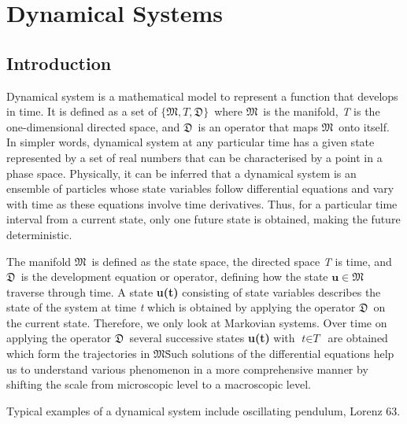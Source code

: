 \chapter{Dynamical Systems}

\section{Introduction}

Dynamical system is a mathematical model to represent a function that develops in time. It is defined as a set of $\lbrace\mathfrak{M},\textit{T},\mathfrak{D}\rbrace$\ where $\mathfrak{M}$\ is the manifold, \textit{T} is the one-dimensional directed space, and $\mathfrak{D}$\ is an operator that maps $\mathfrak{M}$\ onto itself. In simpler words, dynamical system at any particular time has a given state represented by a set of real numbers that can be characterised by a point in a phase space. Physically, it can be inferred that a dynamical system is an ensemble of particles whose state variables follow differential equations and vary with time as these equations involve time derivatives. Thus, for a particular time interval from a current state, only one future state is obtained, making the future deterministic. 

The manifold $\mathfrak{M}$\ is defined as the state space, the directed space \textit{T} is time, and $\mathfrak{D}$\ is the development equation or operator, defining how the state $\textbf{u}\in\mathfrak{M}$ traverse through time. A state \textbf{u(t)} consisting of state variables describes the state of the system at time \textit{t} which is obtained by applying the operator $\mathfrak{D}$\ on the current state. Therefore, we only look at Markovian systems. Over time on applying the operator $\mathfrak{D}$\, several successive states \textbf{u(t)} with $\textit{t}\in\textit{T}$\ are obtained which form the trajectories in $\mathfrak{M}$\. Such solutions of the differential equations help us to understand various phenomenon in a more comprehensive manner by shifting the scale from microscopic level to a macroscopic level.

Typical examples of a dynamical system include oscillating pendulum, Lorenz 63.

